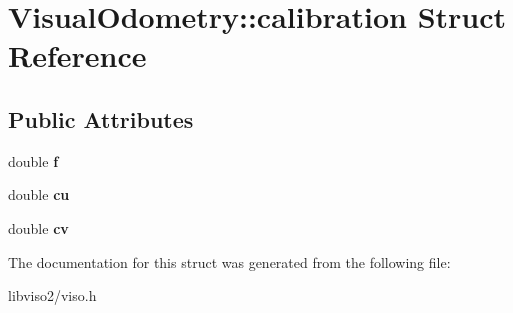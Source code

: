 \hypertarget{struct_visual_odometry_1_1calibration}{\section{Visual\+Odometry\+:\+:calibration Struct Reference}
\label{struct_visual_odometry_1_1calibration}
}
\subsection*{Public Attributes}
\begin{DoxyCompactItemize}
\item 
\hypertarget{struct_visual_odometry_1_1calibration_a9fa5c38587f4db3239c259cbd1ac74c2}{double {\bfseries f}}\label{struct_visual_odometry_1_1calibration_a9fa5c38587f4db3239c259cbd1ac74c2}

\item 
\hypertarget{struct_visual_odometry_1_1calibration_ae957101252afd2112af20c629c693cd8}{double {\bfseries cu}}\label{struct_visual_odometry_1_1calibration_ae957101252afd2112af20c629c693cd8}

\item 
\hypertarget{struct_visual_odometry_1_1calibration_a1a35803278d58b73f7b12ca689e17810}{double {\bfseries cv}}\label{struct_visual_odometry_1_1calibration_a1a35803278d58b73f7b12ca689e17810}

\end{DoxyCompactItemize}


The documentation for this struct was generated from the following file\+:\begin{DoxyCompactItemize}
\item 
libviso2/viso.\+h\end{DoxyCompactItemize}
